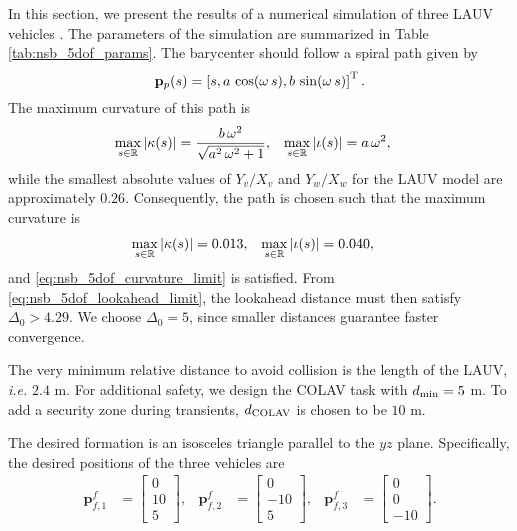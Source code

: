 In this section, we present the results of a numerical simulation of three LAUV vehicles \cite{sousa_LAUV_2012}.
The parameters of the simulation are summarized in Table \ref{tab:nsb_5dof_params}.
The barycenter should follow a spiral path given by
\begin{equation}
    \mathbf{p}_p(s) = \left[s, a\,\cos(\omega\,s), b\,\sin(\omega\,s)\right]^{\mathrm{T}}.
\end{equation}
The maximum curvature of this path is
\begin{align}
    \max_{s \in \mathbb{R}} \left|\kappa(s)\right| &= \frac{b\,\omega ^2}{\sqrt{a^2\,\omega ^2+1}}, &
    \max_{s \in \mathbb{R}} \left|\iota(s)\right| &= a\,\omega ^2,
\end{align}
while the smallest absolute values of $Y_v / X_v$ and $Y_w / X_w$ for the LAUV model are approximately $0.26$.
Consequently, the path is chosen such that the maximum curvature is
\begin{align}
    \max_{s \in \mathbb{R}} \left|\kappa(s)\right| &= 0.013, &
    \max_{s \in \mathbb{R}} \left|\iota(s)\right| &= 0.040,
\end{align}
and \eqref{eq:nsb_5dof_curvature_limit} is satisfied.
From \eqref{eq:nsb_5dof_lookahead_limit}, the lookahead distance must then satisfy $\Delta_0 > 4.29$.
We choose $\Delta_0 = 5$, since smaller distances guarantee faster convergence.

The very minimum relative distance to avoid collision is the length of the LAUV, \emph{i.e.} $2.4$ m.
For additional safety, we design the COLAV task with $d_{\rm min} = 5$ m.
To add a security zone during transients, $d_{\rm COLAV}$ is chosen to be $10$ m.

The desired formation is an isosceles triangle parallel to the $yz$ plane.
Specifically, the desired positions of the three vehicles are
\begin{align}
    \mathbf{p}_{f,1}^f &= \begin{bmatrix} 0 \\ 10 \\ 5\end{bmatrix}, &
    \mathbf{p}_{f,2}^f &= \begin{bmatrix} 0 \\ -10 \\ 5\end{bmatrix}, &
    \mathbf{p}_{f,3}^f &= \begin{bmatrix} 0 \\ 0 \\ -10\end{bmatrix}.
\end{align}


